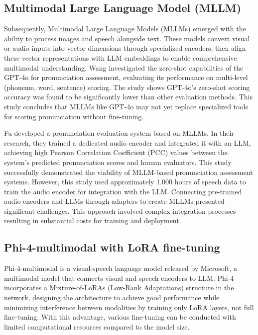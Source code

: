 \documentclass[sigconf,nonacm]{acmart}
\begin{document}
\subsection{Multimodal Large Language Model (MLLM)}
Subsequently, Multimodal Large Language Models (MLLMs) emerged with the ability to process images and speech alongside text. These models convert visual or audio inputs into vector dimensions through specialized encoders, then align these vector representations with LLM embeddings to enable comprehensive multimodal understanding.
Wang \cite{wang2025exploring} investigated the zero-shot capabilities of the GPT-4o \cite{hurst2024gpt} for pronunciation assessment, evaluating its performance on multi-level (phoneme, word, sentence) scoring. The study shows GPT-4o's zero-shot scoring accuracy was found to be significantly lower than other evaluation methods. This study concludes that MLLMs like GPT-4o may not yet replace specialized tools for scoring pronunciation without fine-tuning.

Fu \cite{fu2024pronunciation} developed a pronunciation evaluation system based on MLLMs. In their research, they trained a dedicated audio encoder and integrated it with an LLM, achieving high Pearson Correlation Coefficient (PCC) values between the system's predicted pronunciation scores and human evaluators. This study successfully demonstrated the viability of MLLM-based pronunciation assessment systems. However, this study used approximately 1,000 hours of speech data to train the audio encoder for integration with the LLM. Connecting pre-trained audio encoders and LLMs through adapters to create MLLMs presented significant challenges. This approach involved complex integration processes resulting in substantial costs for training and deployment. 

\subsection{Phi-4-multimodal with LoRA fine-tuning}
Phi-4-multimodal \cite{abouelenin2025phi} is a visual-speech language model released by Microsoft, a multimodal model that connects visual and speech encoders to LLM. Phi-4 incorporates a Mixture-of-LoRAs (Low-Rank Adaptations) structure in the network, designing the architecture to achieve good performance while minimizing interference between modalities by training only LoRA layers, not full fine-tuning. With this advantage, various fine-tuning can be conducted with limited computational resources compared to the model size.
\end{document}
